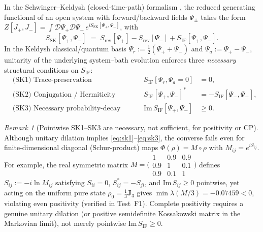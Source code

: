 \documentclass[11pt,a4paper]{article}
\theoremstyle{definition}
\theoremstyle{remark}
\newtheorem{remark}{Remark}
\newcommand{\1}{\mathbf{1}}
\begin{document}
In the Schwinger--Keldysh (closed-time-path) formalism \cite{Schwinger1961,Keldysh1964,FeynmanVernon1963,SiebererBuchholdDiehl2016,LiuGlorioso2018}, the reduced generating functional of an open system with forward/backward fields $\Psi_\pm$ takes the form $Z[J_+,J_-] = \int \mathcal{D}\Psi_+\mathcal{D}\Psi_-\,e^{i S_{\mathrm{SK}}[\Psi_+,\Psi_-]}$, with
\begin{equation}\label{eq:sk-decomp}
  S_{\mathrm{SK}}[\Psi_+, \Psi_-] \;=\; S_{\mathrm{rev}}[\Psi_+] - S_{\mathrm{rev}}[\Psi_-] + S_{\mathrm{IF}}[\Psi_+, \Psi_-].
\end{equation}
In the Keldysh classical/quantum basis $\Psi_r := \frac{1}{2}(\Psi_+ + \Psi_-)$ and $\Psi_a := \Psi_+ - \Psi_-$, unitarity of the underlying system--bath evolution enforces three \emph{necessary} structural conditions on $S_{\mathrm{IF}}$:
\begin{align}
  &\text{(SK1) Trace-preservation normalization:} & S_{\mathrm{IF}}[\Psi_r, \Psi_a = 0] &= 0, \label{eq:sk1}\\
  &\text{(SK2) Conjugation / Hermiticity symmetry:} & S_{\mathrm{IF}}[\Psi_+, \Psi_-]^* &= -S_{\mathrm{IF}}[\Psi_-, \Psi_+], \label{eq:sk2}\\
  &\text{(SK3) Necessary probability-decay positivity:} & \mathrm{Im}\,S_{\mathrm{IF}}[\Psi_+, \Psi_-] &\ge 0. \label{eq:sk3}
\end{align}

\begin{remark}[Pointwise SK1--SK3 are necessary, not sufficient, for positivity or CP]\label{rem:sk-nonsuff}
Although unitary dilation implies \eqref{eq:sk1}--\eqref{eq:sk3}, the converse fails even for finite-dimensional diagonal (Schur-product) maps $\Phi(\rho) = M \circ \rho$ with $M_{ij} = e^{i S_{ij}}$. For example, the real symmetric matrix $M = \bigl(\begin{smallmatrix} 1 & 0.9 & 0.9 \\ 0.9 & 1 & 0.1 \\ 0.9 & 0.1 & 1 \end{smallmatrix}\bigr)$ defines $S_{ij} := -i\ln M_{ij}$ satisfying $S_{ii} = 0$, $S_{ij}^* = -S_{ji}$, and $\mathrm{Im}\,S_{ij} \ge 0$ pointwise, yet acting on the uniform pure state $\rho_0 = \frac{1}{3}\mathbf{J}_3$ gives $\min\lambda(M/3) = -0.07459 < 0$, violating even positivity (verified in Test~F1). Complete positivity requires a genuine unitary dilation (or positive semidefinite Kossakowski matrix in the Markovian limit), not merely pointwise $\mathrm{Im}\,S_{\mathrm{IF}} \ge 0$.
\end{remark}
\end{document}
